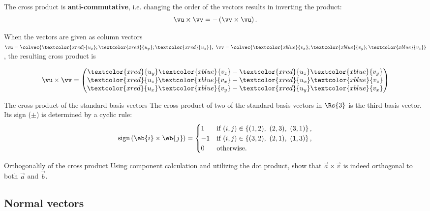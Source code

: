 The cross product is \textbf{anti-commutative}, i.e. changing the order of the vectors results in inverting the product:
  \begin{equation*}
  \vu\times\vv = -\left( \vv\times\vu \right).
  \end{equation*}

When the vectors are given as column vectors $\vu=\colvec{\textcolor{xred}{u_{x}};\textcolor{xred}{u_{y}};\textcolor{xred}{u_{z}}},\ \vv=\colvec{\textcolor{xblue}{v_{x}};\textcolor{xblue}{v_{y}};\textcolor{xblue}{v_{z}}}$, the resulting cross product is

\begin{equation}
	\vu\times\vv = \begin{pmatrix}\textcolor{xred}{u_{y}}\textcolor{xblue}{v_{z}}-\textcolor{xred}{u_{z}}\textcolor{xblue}{v_{y}}\\\textcolor{xred}{u_{z}}\textcolor{xblue}{v_{x}}-\textcolor{xred}{u_{x}}\textcolor{xblue}{v_{z}}\\\textcolor{xred}{u_{x}}\textcolor{xblue}{v_{y}}-\textcolor{xred}{u_{y}}\textcolor{xblue}{v_{x}}\end{pmatrix}
	\label{eq:cross product calculation}
\end{equation}

\begin{note}{The cross product of the standard basis vectors}{}
	The cross product of two of the standard basis vectors in $\Rs{3}$ is the third basis vector. Its sign ($\pm$) is determined by a cyclic rule:
	\begin{equation*}
		\text{sign}\left( \eb{i}\times\eb{j} \right) =
		\begin{cases}
			1 & \text{if } (i,j)\in \left\{(1,2),\ (2,3),\ (3,1)\right\},\\
			-1 & \text{if } (i,j)\in \left\{(3,2),\ (2,1),\ (1,3)\right\},\\
			0 & \text{otherwise}.
		\end{cases}
	\end{equation*}
\end{note}
\begin{challenge}{Orthogonalily of the cross product}{}
	Using component calculation and utilizing the dot product, show that $\vec{a}\times\vec{v}$ is indeed orthogonal to both $\vec{a}$ and $\vec{b}$.
\end{challenge}

\subsection{Normal vectors}

